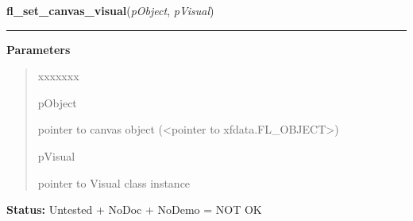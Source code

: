 \hspace{.8\funcindent}\begin{boxedminipage}{\funcwidth}

    \raggedright \textbf{fl\_set\_canvas\_visual}(\textit{pObject}, \textit{pVisual})

    \vspace{-1.5ex}

    \rule{\textwidth}{0.5\fboxrule}
\setlength{\parskip}{2ex}
\setlength{\parskip}{1ex}
      \textbf{Parameters}
      \vspace{-1ex}

      \begin{quote}
        \begin{Ventry}{xxxxxxx}

          \item[pObject]

          pointer to canvas object ({\textless}pointer to 
          xfdata.FL\_OBJECT{\textgreater})

          \item[pVisual]

          pointer to Visual class instance

        \end{Ventry}

      \end{quote}

\textbf{Status:} Untested + NoDoc + NoDemo = NOT OK



    \end{boxedminipage}

    \label{xformslib:library:fl_set_canvas_depth}

    \vspace{0.5ex}

